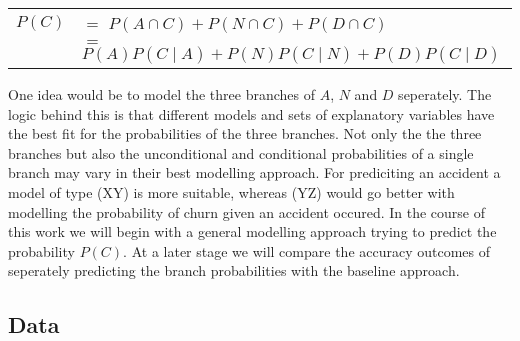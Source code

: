 \documentclass[12pt,titlepage]{article}
\begin{document}
\begin{center}
    \begin{tabular}{ll}
        $P(C)$ & $=$ \hspace{3mm} $P(A\cap C) + P(N\cap C) + P(D\cap C)$ \\
        & $=$ \hspace{3mm} $P(A)P(C\mid A) + P(N)P(C\mid N) + P(D)P(C\mid D)$ \\
    \end{tabular}
\end{center} \par

One idea would be to model the three branches of $A$, $N$ and $D$ seperately. The logic behind this is that different models and
sets of explanatory variables have the best fit for the probabilities of the three branches. Not only the the three branches
but also the unconditional and conditional probabilities of a single branch may vary in their best modelling approach. For prediciting
an accident a model of type (XY) is more suitable, whereas (YZ) would go better with modelling the probability of churn given an
accident occured. In the course of this work we will begin with a general modelling approach trying to predict the probability $P(C)$.
At a later stage we will compare the accuracy outcomes of seperately predicting the branch probabilities with the baseline approach. \\

\subsection{Data} \par
\end{document}
